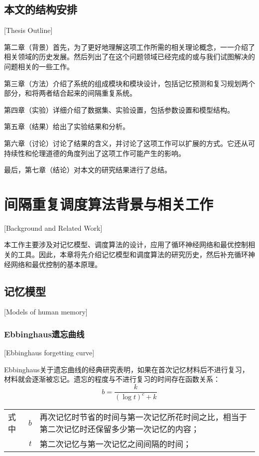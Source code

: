 \section{本文的结构安排}[Thesis Outline]

第二章（背景）首先，为了更好地理解这项工作所需的相关理论概念，一一介绍了相关领域的历史发展。然后列出了在这个问题领域已经完成的或与我们试图解决的问题相关的一些工作。

第三章（方法）介绍了系统的组成模块和模块设计，包括记忆预测和复习规划两个部分，和将两者结合起来的间隔重复系统。

第四章（实验）详细介绍了数据集、实验设置，包括参数设置和模型结构。

第五章（结果）给出了实验结果和分析。

第六章（讨论）讨论了结果的含义，并讨论了这项工作可以扩展的方式。它还从可持续性和伦理道德的角度列出了这项工作可能产生的影响。

最后，第七章（结论）对本文的研究结果进行了总结。

\chapter{间隔重复调度算法背景与相关工作}[Background and Related Work]

本工作主要涉及对记忆模型、调度算法的设计，应用了循环神经网络和最优控制相关的工具。因此，本章将先介绍记忆模型和调度算法的研究历史，然后补充循环神经网络和最优控制的基本原理。

\section{记忆模型}[Models of human memory]

\subsection{Ebbinghaus遗忘曲线}[Ebbinghaus forgetting curve]

Ebbinghaus关于遗忘曲线的经典研究表明\cite{ebbinghausMemoryContributionExperimental1913}，如果在首次记忆材料后不进行复习，材料就会逐渐被忘记。遗忘的程度与不进行复习的时间存在函数关系：
\begin{equation}
b = \frac{k}{(\log t)^c + k}
\end{equation}
\begin{tabularx}{\textwidth}{@{}l@{\quad}r@{———}X@{}}
    式中& $b$ &再次记忆时节省的时间与第一次记忆所花时间之比，相当于第二次记忆时还保留多少第一次记忆的内容；\\
    &  $t$ &第二次记忆与第一次记忆之间间隔的时间；
\end{tabularx}\vspace{3.15bp}

